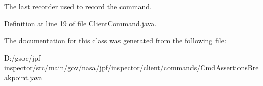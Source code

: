 The last recorder used to record the command. 



Definition at line 19 of file Client\+Command.\+java.



The documentation for this class was generated from the following file\+:\begin{DoxyCompactItemize}
\item 
D\+:/gsoc/jpf-\/inspector/src/main/gov/nasa/jpf/inspector/client/commands/\hyperlink{_cmd_assertions_breakpoint_8java}{Cmd\+Assertions\+Breakpoint.\+java}\end{DoxyCompactItemize}
